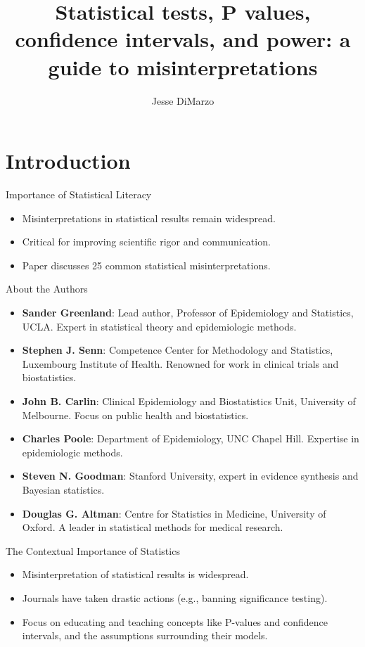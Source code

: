 \documentclass[aspectratio=169, 12pt]{beamer}
\title{Statistical tests, P values, confidence intervals, and power: a guide
to misinterpretations}
\author{Jesse DiMarzo}
\begin{document}
 
\frame{\titlepage}

 
\section{Introduction}
\begin{frame}{Importance of Statistical Literacy}
\begin{itemize}
    \item Misinterpretations in statistical results remain widespread.
    \item Critical for improving scientific rigor and communication. 
    \item Paper discusses 25 common statistical misinterpretations.
\end{itemize}
\end{frame}


\begin{frame}{About the Authors}
\begin{itemize}
    \item \textbf{Sander Greenland}: Lead author, Professor of Epidemiology and Statistics, UCLA. Expert in statistical theory and epidemiologic methods.
    \item \textbf{Stephen J. Senn}: Competence Center for Methodology and Statistics, Luxembourg Institute of Health. Renowned for work in clinical trials and biostatistics.
    \item \textbf{John B. Carlin}: Clinical Epidemiology and Biostatistics Unit, University of Melbourne. Focus on public health and biostatistics.
    \item \textbf{Charles Poole}: Department of Epidemiology, UNC Chapel Hill. Expertise in epidemiologic methods.
    \item \textbf{Steven N. Goodman}: Stanford University, expert in evidence synthesis and Bayesian statistics.
    \item \textbf{Douglas G. Altman}: Centre for Statistics in Medicine, University of Oxford. A leader in statistical methods for medical research.
\end{itemize}
\end{frame}



\begin{frame}{The Contextual Importance of Statistics}
\begin{itemize}
    \item Misinterpretation of statistical results is widespread.
    \item Journals have taken drastic actions (e.g., banning significance testing).
    \item Focus on educating and teaching concepts like P-values and confidence intervals, and the assumptions surrounding their models.
\end{itemize}
\end{frame}
\end{document}
